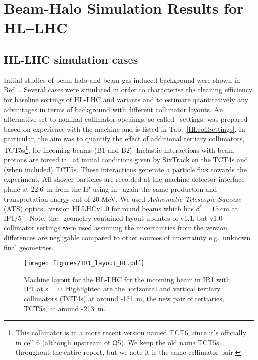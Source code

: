 \section{Beam-Halo Simulation Results for HL--LHC\label{hllhcResults}}

\subsection{HL-LHC simulation cases}

Initial studies of beam-halo and beam-gas induced background were shown in Ref.~\cite{kweeIpac14,ipac2015_rkh}. Several cases were simulated in order to characterise the cleaning efficiency for baseline settings of HL-LHC and variants and to estimate quantitatively any advantages in terms of background with different collimator layouts. An alternative set to nominal collimator openings, so called \twosigmaret~settings, was prepared \cite{bruce14_n1_ap_meas} based on experience with the machine and is listed in Tab.~\ref{HLcollSettings}. In particular, the aim was to quantify the effect of additional tertiary collimators, TCT5s\footnote{This collimator is in a more recent version named TCT6, since it's officially in cell 6 (although upstream of Q5). We keep the old name TCT5s throughout the entire report, but we note it is the same collimator pair.}, for incoming beams (B1 and B2). Inelastic interactions with beam protons are forced in \fluka~at initial conditions given by SixTrack on the TCT4s and (when included) TCT5s. These interactions generate a particle flux towards the experiment. All shower particles are recorded at the machine-detector interface plane at 22.6~m from the IP using in \fluka~again the same production and transportation energy cut of 20 MeV. We used \textit{Achromatic Telescopic Squeeze} (ATS) optics~\cite{ATSref} version HLLHCv1.0 for round beams which has $\beta^* = 15~$cm at IP1/5~\cite{opticsWebRef}. Note, the \fluka~geometry contained layout updates of v1.1, but v1.0 collimator settings were used assuming the uncertainties from the version differences are negligable compared to other sources of uncertainty e.g.~unknown final geometries. 

\begin{figure}%
\begin{center}
\texttt{[image: figures/IR1\_layout\_HL.pdf]}
\end{center}
\vspace{-0.6cm}
 \caption{Machine layout for the HL-LHC for the incoming beam in IR1 with IP1 at s = 0. Highlighted are the horizontal and vertical tertiary collimators (TCT4s) at around -131~m, the new pair of tertiaries, TCT5s, at around -213~m.
  \label{hllhc_layout}}
\end{figure}


